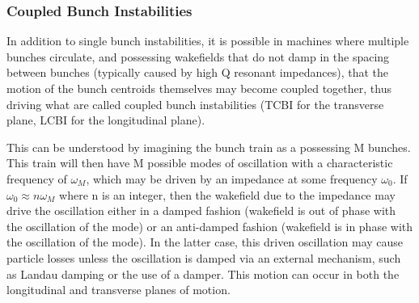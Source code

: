 \subsubsection{Coupled Bunch Instabilities}

In addition to single bunch instabilities, it is possible in machines where multiple bunches circulate, and possessing wakefields that do not damp in the spacing between bunches (typically caused by high Q resonant impedances), that the motion of the bunch centroids themselves may become coupled together, thus driving what are called coupled bunch instabilities (TCBI for the transverse plane, LCBI for the longitudinal plane). 

This can be understood by imagining the bunch train as a possessing M bunches. This train will then have M possible modes of oscillation with a characteristic frequency of $\omega_{M}$, which may be driven by an impedance at some frequency $\omega_{0}$. If $\omega_{0} \approx n\omega_{M}$ where n is an integer, then the wakefield due to the impedance may drive the oscillation either in a damped fashion (wakefield is out of phase with the oscillation of the mode) or an anti-damped fashion (wakefield is in phase with the oscillation of the mode). In the latter case, this driven oscillation may cause particle losses unless the oscillation is damped via an external mechanism, such as Landau damping or the use of a damper. This motion can occur in both the longitudinal and transverse planes of motion.

